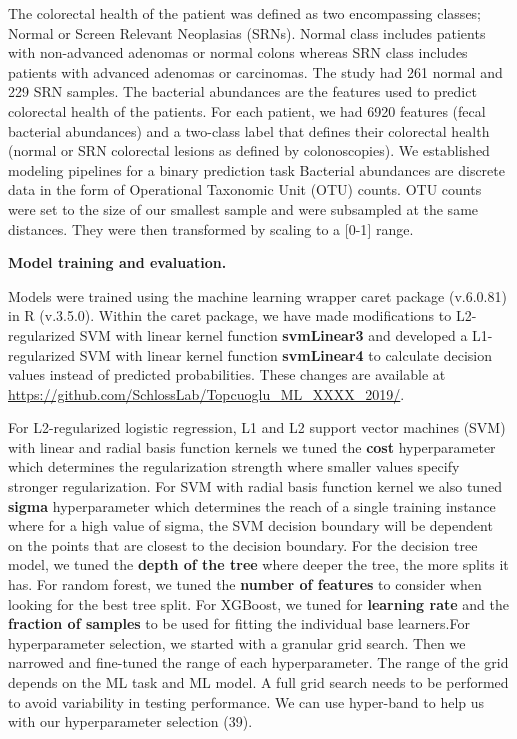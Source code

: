 \documentclass[11pt,]{article}
\begin{document}
The colorectal health of the patient was defined as two encompassing
classes; Normal or Screen Relevant Neoplasias (SRNs). Normal class
includes patients with non-advanced adenomas or normal colons whereas
SRN class includes patients with advanced adenomas or carcinomas. The
study had 261 normal and 229 SRN samples. The bacterial abundances are
the features used to predict colorectal health of the patients. For each
patient, we had 6920 features (fecal bacterial abundances) and a
two-class label that defines their colorectal health (normal or SRN
colorectal lesions as defined by colonoscopies). We established modeling
pipelines for a binary prediction task Bacterial abundances are discrete
data in the form of Operational Taxonomic Unit (OTU) counts. OTU counts
were set to the size of our smallest sample and were subsampled at the
same distances. They were then transformed by scaling to a {[}0-1{]}
range.

\textbf{Model training and evaluation.}

Models were trained using the machine learning wrapper caret package
(v.6.0.81) in R (v.3.5.0). Within the caret package, we have made
modifications to L2-regularized SVM with linear kernel function
\textbf{svmLinear3} and developed a L1-regularized SVM with linear
kernel function \textbf{svmLinear4} to calculate decision values instead
of predicted probabilities. These changes are available at
\url{https://github.com/SchlossLab/Topcuoglu_ML_XXXX_2019/}.

For L2-regularized logistic regression, L1 and L2 support vector
machines (SVM) with linear and radial basis function kernels we tuned
the \textbf{cost} hyperparameter which determines the regularization
strength where smaller values specify stronger regularization. For SVM
with radial basis function kernel we also tuned \textbf{sigma}
hyperparameter which determines the reach of a single training instance
where for a high value of sigma, the SVM decision boundary will be
dependent on the points that are closest to the decision boundary. For
the decision tree model, we tuned the \textbf{depth of the tree} where
deeper the tree, the more splits it has. For random forest, we tuned the
\textbf{number of features} to consider when looking for the best tree
split. For XGBoost, we tuned for \textbf{learning rate} and the
\textbf{fraction of samples} to be used for fitting the individual base
learners.For hyperparameter selection, we started with a granular grid
search. Then we narrowed and fine-tuned the range of each
hyperparameter. The range of the grid depends on the ML task and ML
model. A full grid search needs to be performed to avoid variability in
testing performance. We can use hyper-band to help us with our
hyperparameter selection (39).
\end{document}
